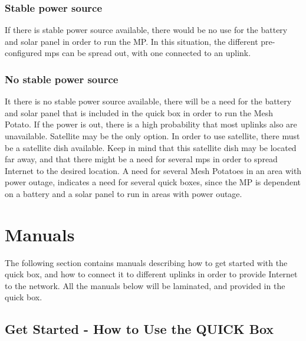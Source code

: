 \subsubsection{Stable power source}
If there is stable power source available, there would be no use for the battery and solar panel in order to run the MP. In this situation, the different pre-configured \glspl{mp} can be spread out, with one connected to an uplink. 

\subsubsection{No stable power source}
It there is no stable power source available, there will be a need for the battery and solar panel that is included in the \gls{quick} box in order to run the Mesh Potato. If the power is out, there is a high probability that most uplinks also are unavailable. Satellite may be the only option. In order to use satellite, there must be a satellite dish available. Keep in mind that this satellite dish may be located far away, and that there might be a need for several \glspl{mp} in order to spread Internet to the desired location. A need for several Mesh Potatoes in an area with power outage, indicates a need for several \gls{quick} boxes, since the MP is dependent on a battery and a solar panel to run in areas with power outage. 


\section{Manuals}
The following section contains manuals describing how to get started with the \gls{quick} box, and how to connect it to different uplinks in order to provide Internet to the network. All the manuals below will be laminated, and provided in the \gls{quick} box. 
\clearpage
\subsection{Get Started - How to Use the QUICK Box}

\clearpage
